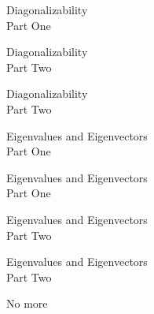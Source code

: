 \documentclass{titlescreen}
\begin{document}
\begin{videotitle}
  Diagonalizability \\[1ex]
  Part One
\end{videotitle}
\begin{videoend}
  Diagonalizability \\[1ex]
  Part Two
\end{videoend}

\begin{videotitle}
  Diagonalizability \\[1ex]
  Part Two
\end{videotitle}
\begin{videoend}
  Eigenvalues and Eigenvectors \\[1ex]
  Part One
\end{videoend}

\begin{videotitle}
  Eigenvalues and Eigenvectors \\[1ex]
  Part One
\end{videotitle}
\begin{videoend}
  Eigenvalues and Eigenvectors \\[1ex]
  Part Two
\end{videoend}

\begin{videotitle}
  Eigenvalues and Eigenvectors \\[1ex]
  Part Two
\end{videotitle}
\begin{videoend}
  No more
\end{videoend}





\end{document}
